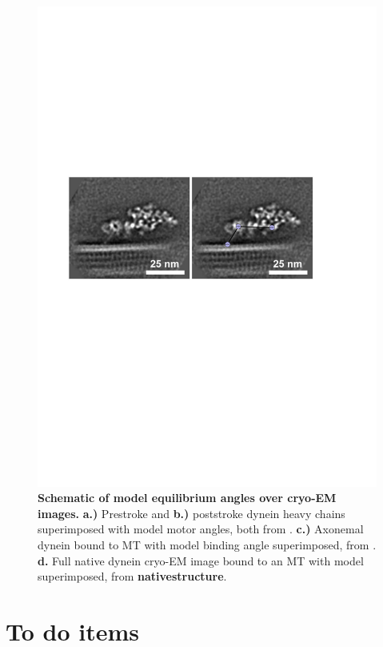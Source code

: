 \documentclass[9pt,twocolumn,twoside]{pnas-new}
\begin{document}
\begin{figure}[tbhp]
\includegraphics[width=0.5\columnwidth]{figures/schematic-full}
  \caption{\textbf{Schematic of model equilibrium angles over cryo-EM
      images.} \textbf{a.)} Prestroke and \textbf{b.)} poststroke
    dynein heavy chains superimposed with model motor angles, both
    from \cite{burgess-paper}. \textbf{c.)} Axonemal dynein bound to
    MT with model binding angle superimposed, from
    \cite{leschziner}. \textbf{d.} Full native dynein cryo-EM image
    bound to an MT with model superimposed, from
    \textbf{nativestructure}.}
\label{fig:modelangles}
\end{figure}

\section{To do items}
\end{document}
